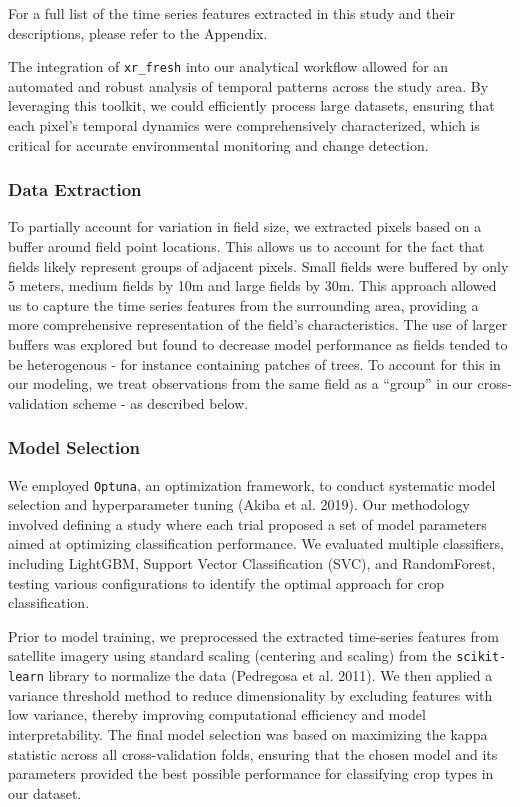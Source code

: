 \documentclass[
  journal,
  twocolumn]{IEEEtran}
\begin{document}
For a full list of the time series features extracted in this study and
their descriptions, please refer to the Appendix.

The integration of \texttt{xr\_fresh} into our analytical workflow
allowed for an automated and robust analysis of temporal patterns across
the study area. By leveraging this toolkit, we could efficiently process
large datasets, ensuring that each pixel's temporal dynamics were
comprehensively characterized, which is critical for accurate
environmental monitoring and change detection.

\hypertarget{data-extraction}{%
\subsubsection{Data Extraction}\label{data-extraction}}

To partially account for variation in field size, we extracted pixels
based on a buffer around field point locations. This allows us to
account for the fact that fields likely represent groups of adjacent
pixels. Small fields were buffered by only 5 meters, medium fields by
10m and large fields by 30m. This approach allowed us to capture the
time series features from the surrounding area, providing a more
comprehensive representation of the field's characteristics. The use of
larger buffers was explored but found to decrease model performance as
fields tended to be heterogenous - for instance containing patches of
trees. To account for this in our modeling, we treat observations from
the same field as a ``group'' in our cross-validation scheme - as
described below.

\hypertarget{model-selection}{%
\subsubsection{Model Selection}\label{model-selection}}

We employed \texttt{Optuna}, an optimization framework, to conduct
systematic model selection and hyperparameter tuning (Akiba et al.
2019). Our methodology involved defining a study where each trial
proposed a set of model parameters aimed at optimizing classification
performance. We evaluated multiple classifiers, including LightGBM,
Support Vector Classification (SVC), and RandomForest, testing various
configurations to identify the optimal approach for crop classification.

Prior to model training, we preprocessed the extracted time-series
features from satellite imagery using standard scaling (centering and
scaling) from the \texttt{scikit-learn} library to normalize the data
(Pedregosa et al. 2011). We then applied a variance threshold method to
reduce dimensionality by excluding features with low variance, thereby
improving computational efficiency and model interpretability. The final
model selection was based on maximizing the kappa statistic across all
cross-validation folds, ensuring that the chosen model and its
parameters provided the best possible performance for classifying crop
types in our dataset.
\end{document}

